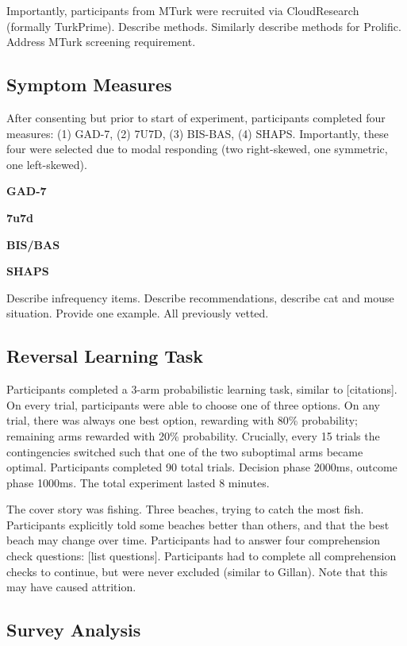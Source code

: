 \documentclass[a4paper,notitlepage,12pt]{article}
\begin{document}
Importantly, participants from MTurk were recruited via CloudResearch (formally TurkPrime). Describe methods. Similarly describe methods for Prolific. Address MTurk screening requirement. 

\subsection{Symptom Measures}

After consenting but prior to start of experiment, participants completed four measures: (1) GAD-7, (2) 7U7D, (3) BIS-BAS, (4) SHAPS. Importantly, these four were selected due to modal responding (two right-skewed, one symmetric, one left-skewed). 

\textbf{GAD-7}

\textbf{7u7d}

\textbf{BIS/BAS}

\textbf{SHAPS}

Describe infrequency items. Describe recommendations, describe cat and mouse situation. Provide one example. All previously vetted. 

\subsection{Reversal Learning Task}

Participants completed a 3-arm probabilistic learning task, similar to [citations]. On every trial, participants were able to choose one of three options. On any trial, there was always one best option, rewarding with 80\% probability; remaining arms rewarded with 20\% probability. Crucially, every 15 trials the contingencies switched such that one of the two suboptimal arms became optimal. Participants completed 90 total trials. Decision phase 2000ms, outcome phase 1000ms. The total experiment lasted 8 minutes.

The cover story was fishing. Three beaches, trying to catch the most fish. Participants explicitly told some beaches better than others, and that the best beach may change over time. Participants had to answer four comprehension check questions: [list questions]. Participants had to complete all comprehension checks to continue, but were never excluded (similar to Gillan). Note that this may have caused attrition.

\subsection{Survey Analysis}
\end{document}
